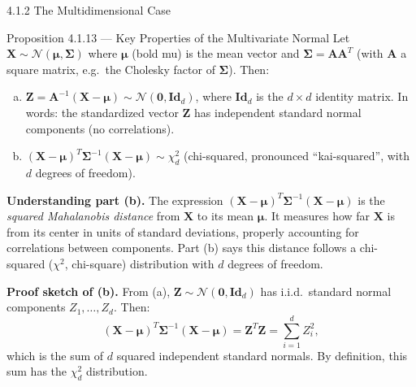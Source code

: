 \documentclass[aspectratio=169,10pt]{beamer}
\begin{document}
\begin{frame}[allowframebreaks]{4.1.2 The Multidimensional Case}
\framebreak

\begin{block}{Proposition 4.1.13 --- Key Properties of the Multivariate Normal}
  Let $\mathbf{X} \sim \mathcal{N}(\boldsymbol{\mu}, \boldsymbol{\Sigma})$
  where $\boldsymbol{\mu}$ (bold mu) is the mean vector and
  $\boldsymbol{\Sigma} = \mathbf{A}\mathbf{A}^T$ (with $\mathbf{A}$
  a square matrix, e.g.\ the Cholesky factor of $\boldsymbol{\Sigma}$).
  Then:
  \begin{enumerate}[(a)]
    \item $\mathbf{Z} = \mathbf{A}^{-1}(\mathbf{X} - \boldsymbol{\mu})
      \sim \mathcal{N}(\mathbf{0}, \mathbf{Id}_d)$, where $\mathbf{Id}_d$
      is the $d \times d$ identity matrix.  In words: the standardized
      vector $\mathbf{Z}$ has independent standard normal components
      (no correlations).
    \item $(\mathbf{X}-\boldsymbol{\mu})^T\boldsymbol{\Sigma}^{-1}(\mathbf{X}-\boldsymbol{\mu})
      \sim \chi_d^2$ (chi-squared, pronounced ``kai-squared'', with $d$
      degrees of freedom).
  \end{enumerate}
\end{block}

\textbf{Understanding part (b).}
The expression $(\mathbf{X}-\boldsymbol{\mu})^T\boldsymbol{\Sigma}^{-1}(\mathbf{X}-\boldsymbol{\mu})$
is the \emph{squared Mahalanobis distance} from $\mathbf{X}$ to its
mean $\boldsymbol{\mu}$.  It measures how far $\mathbf{X}$ is from
its center in units of standard deviations, properly accounting for
correlations between components.  Part (b) says this distance follows
a chi-squared ($\chi^2$, chi-square) distribution with $d$ degrees of
freedom.

\textbf{Proof sketch of (b).}
From (a), $\mathbf{Z} \sim \mathcal{N}(\mathbf{0}, \mathbf{Id}_d)$
has i.i.d.\ standard normal components $Z_1, \ldots, Z_d$.  Then:
\[
  (\mathbf{X}-\boldsymbol{\mu})^T\boldsymbol{\Sigma}^{-1}(\mathbf{X}-\boldsymbol{\mu})
  = \mathbf{Z}^T\mathbf{Z} = \sum_{i=1}^d Z_i^2,
\]
which is the sum of $d$ squared independent standard normals.
By definition, this sum has the $\chi_d^2$ distribution.


\end{frame}
\end{document}
